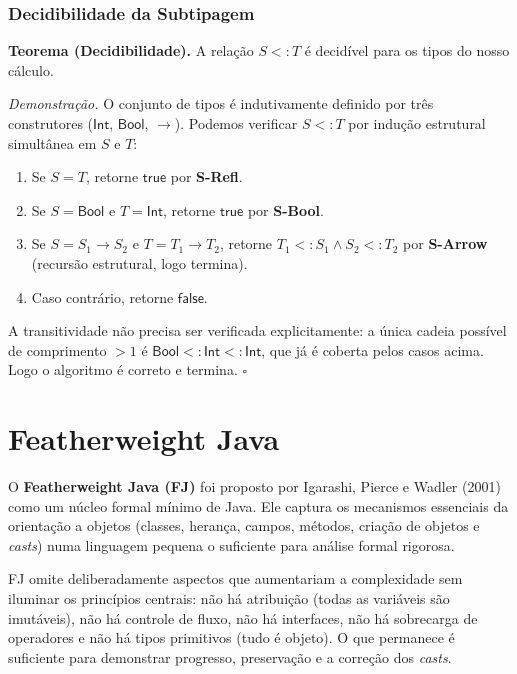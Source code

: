 \subsubsection{Decidibilidade da Subtipagem}

\textbf{Teorema (Decidibilidade).} A relação \(S <: T\) é decidível
para os tipos do nosso cálculo.

\emph{Demonstração.} O conjunto de tipos é indutivamente definido por
três construtores (\(\mathsf{Int}\), \(\mathsf{Bool}\), \(\to\)).
Podemos verificar \(S <: T\) por indução estrutural simultânea em \(S\) e \(T\):

\begin{enumerate}
  \item
    Se \(S = T\), retorne \(\mathsf{true}\) por \textbf{S-Refl}.
  \item
    Se \(S = \mathsf{Bool}\) e \(T = \mathsf{Int}\), retorne
    \(\mathsf{true}\) por \textbf{S-Bool}.
  \item
    Se \(S = S_1 \to S_2\) e \(T = T_1 \to T_2\), retorne
    \(T_1 <: S_1 \land S_2 <: T_2\) por \textbf{S-Arrow} (recursão estrutural,
    logo termina).
  \item
    Caso contrário, retorne \(\mathsf{false}\).
\end{enumerate}

A transitividade não precisa ser verificada explicitamente: a única
cadeia possível de comprimento \(> 1\) é
\(\mathsf{Bool} <: \mathsf{Int} <: \mathsf{Int}\), que
já é coberta pelos casos acima. Logo o algoritmo é correto e termina.
\(\square\)

\section{Featherweight Java}

O \textbf{Featherweight Java (FJ)} foi proposto por Igarashi, Pierce
e Wadler (2001) como um núcleo formal mínimo de Java. Ele captura os
mecanismos essenciais da orientação a objetos (classes, herança,
campos, métodos, criação de objetos e \emph{casts}) numa linguagem
pequena o suficiente para análise formal rigorosa.

FJ omite deliberadamente aspectos que aumentariam a complexidade sem
iluminar os princípios centrais: não há atribuição (todas as
variáveis são imutáveis), não há controle de fluxo, não há
interfaces, não há sobrecarga de operadores e não há tipos primitivos
(tudo é objeto). O que permanece é suficiente para demonstrar
progresso, preservação e a correção dos \emph{casts}.

